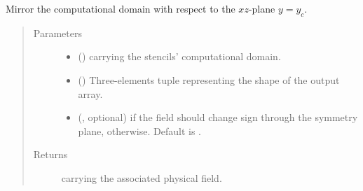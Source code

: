 \documentclass[letterpaper,10pt,english]{sphinxmanual}
\begin{document}
\begin{fulllineitems}
\begin{fulllineitems}
\begin{quote}
\begin{description}
\begin{itemize}
\end{itemize}

\end{description}\end{quote}

\end{fulllineitems}


\begin{fulllineitems}
\label{\detokenize{api:dycore.horizontal_boundary.RelaxedSymmetricXZ.from_computational_to_physical_domain}}
Mirror the computational domain with respect to the \(xz\)-plane \(y = y_c\).
\begin{quote}\begin{description}
\item[{Parameters}] \leavevmode\begin{itemize}
\item {} 
 () \textendash{}  carrying the stencils’ computational domain.

\item {} 
 () \textendash{} Three-elements tuple representing the shape of the output array.

\item {} 
 (, optional) \textendash{}  if the field should change sign through the
symmetry plane,  otherwise. Default is .

\end{itemize}

\item[{Returns}] \leavevmode
{} carrying the associated physical field.

\end{description}\end{quote}

\end{fulllineitems}


\end{fulllineitems}
\end{document}
